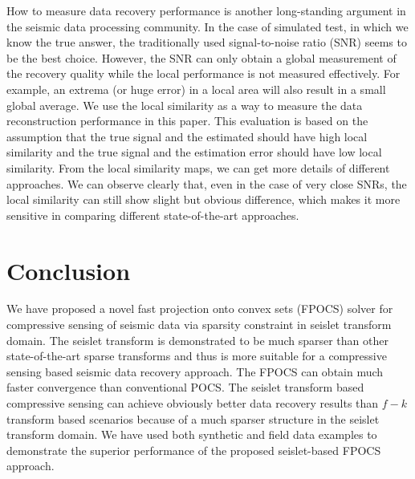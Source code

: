 How to measure data recovery performance is another long-standing argument in the seismic data processing community. In the case of simulated test, in which we know the true answer, the traditionally used signal-to-noise ratio (SNR) seems to be the best choice. However, the SNR can only obtain a global measurement of the recovery quality while the local performance is not measured effectively. For example, an extrema (or huge error) in a local area will also result in a small global average. We use the local similarity \cite[]{fomel2007localattr} as a way to measure the data reconstruction performance in this paper. This evaluation is based on the assumption that the true signal and the estimated should have high local similarity and the true signal and the estimation error should have low local similarity. From the local similarity maps, we can get more details of different approaches. We can observe clearly that, even in the case of very close SNRs, the local similarity can still show slight but obvious difference, which makes it more sensitive in comparing different state-of-the-art approaches. 


\section{Conclusion}
We have proposed a novel fast projection onto convex sets (FPOCS) solver for compressive sensing of seismic data via sparsity constraint in seislet transform domain. The seislet transform is demonstrated to be much sparser than other state-of-the-art sparse transforms and thus is more suitable for a compressive sensing based seismic data recovery approach. The FPOCS can obtain much faster convergence than conventional POCS.  The seislet transform based compressive sensing can achieve obviously better data recovery results than $f-k$ transform based scenarios because of a much sparser structure in the seislet transform domain. We have used both synthetic and field data examples to demonstrate the superior performance of the proposed seislet-based FPOCS approach. 

